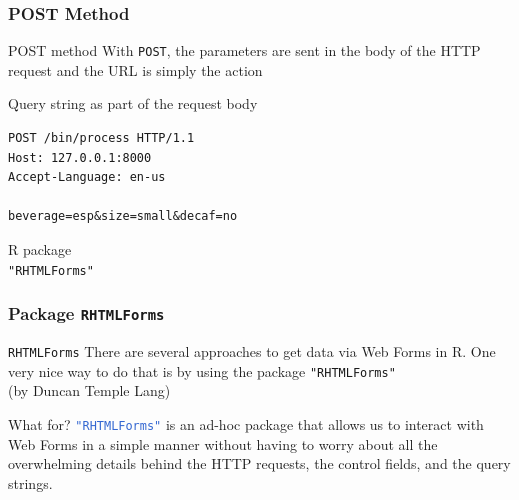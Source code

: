 \documentclass{beamer}\usepackage[]{graphicx}\usepackage[]{color}
\newcommand{\code}[1]{\texttt{#1}}
\newcommand{\low}[1]{\textcolor{lowlight}{#1}}
\newcommand{\highcode}[1]{\textcolor{highlight}{\texttt{#1}}}
\begin{document}

\begin{frame}[fragile]
\frametitle{POST Method}

\begin{block}{POST method}
With \code{POST}, the parameters are sent in the body of the HTTP request and the URL is simply the action
\end{block}

\begin{block}{Query string as part of the request body}
{\footnotesize
\begin{verbatim}
POST /bin/process HTTP/1.1
Host: 127.0.0.1:8000
Accept-Language: en-us

beverage=esp&size=small&decaf=no
\end{verbatim}
}
\end{block}

\end{frame}


\begin{frame}
 \begin{center}
  \Huge{\textcolor{mandarina}{R package \\ \code{"RHTMLForms"}}}
 \end{center}
\end{frame}


\begin{frame}
\frametitle{Package \code{RHTMLForms}}

\begin{block}{\code{RHTMLForms}}
There are several approaches to get data via Web Forms in R. One very nice way to do that is by using the package \code{"RHTMLForms"} \\
\low{(by Duncan Temple Lang)}
\end{block}

\begin{block}{What for?}
\highcode{"RHTMLForms"} is an ad-hoc package that allows us to interact with Web Forms in a simple manner without having to worry about all the overwhelming details behind the HTTP requests, the control fields, and the query strings.
\end{block}

\end{frame}

\end{document}
